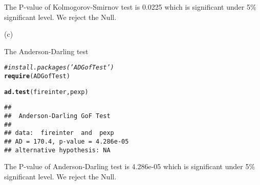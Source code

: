 \documentclass{article}\usepackage[]{graphicx}\usepackage[]{color}
\makeatletter
\newcommand{\hlcom}[1]{\textcolor[rgb]{0.678,0.584,0.686}{\textit{#1}}}%
\newcommand{\hlstd}[1]{\textcolor[rgb]{0.345,0.345,0.345}{#1}}%
\newcommand{\hlkwd}[1]{\textcolor[rgb]{0.737,0.353,0.396}{\textbf{#1}}}%
\newenvironment{kframe}{%
 \def\at@end@of@kframe{}%
 \ifinner\ifhmode%
  \def\at@end@of@kframe{\end{minipage}}%
  \begin{minipage}{\columnwidth}%
 \fi\fi%
 \def\FrameCommand##1{\hskip\@totalleftmargin \hskip-\fboxsep
 \colorbox{shadecolor}{##1}\hskip-\fboxsep
     \hskip-\linewidth \hskip-\@totalleftmargin \hskip\columnwidth}%
 \MakeFramed {\advance\hsize-\width
   \@totalleftmargin\z@ \linewidth\hsize
   \@setminipage}}%
 {\par\unskip\endMakeFramed%
 \at@end@of@kframe}
\newenvironment{knitrout}{}{} %
\makeatother
\begin{document}
The P-value of Kolmogorov-Smirnov test is 0.0225 which is significant under 5\% significant level. We reject the Null.

{\Large{(c)}}

The Anderson-Darling test
\begin{knitrout}
\color{fgcolor}\begin{kframe}
\begin{alltt}
\hlcom{# install.packages('ADGofTest')}
\hlkwd{require}\hlstd{(ADGofTest)}
\end{alltt}


{\ttfamily\noindent\itshape\color{messagecolor}{\#\# Loading required package: ADGofTest}}\begin{alltt}
\hlkwd{ad.test}\hlstd{(fireinter, pexp)}
\end{alltt}
\begin{verbatim}
## 
## 	Anderson-Darling GoF Test
## 
## data:  fireinter  and  pexp
## AD = 170.4, p-value = 4.286e-05
## alternative hypothesis: NA
\end{verbatim}
\end{kframe}
\end{knitrout}

The P-value of Anderson-Darling test is 4.286e-05 which is significant under 5\% significant level. We reject the Null.
\end{document}

